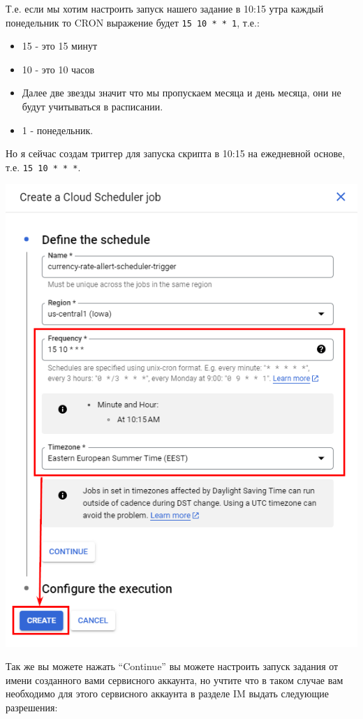 \documentclass[
]{book}
\providecommand{\tightlist}{%
  \setlength{\itemsep}{0pt}\setlength{\parskip}{0pt}}
\begin{document}
Т.е. если мы хотим настроить запуск нашего задание в 10:15 утра каждый понедельник то CRON выражение будет \texttt{15\ 10\ *\ *\ 1}, т.е.:

\begin{itemize}
\tightlist
\item
  15 - это 15 минут
\item
  10 - это 10 часов
\item
  Далее две звезды значит что мы пропускаем месяца и день месяца, они не будут учитываться в расписании.
\item
  1 - понедельник.
\end{itemize}

Но я сейчас создам триггер для запуска скрипта в 10:15 на ежедневной основе, т.е. \texttt{15\ 10\ *\ *\ *}.

\includegraphics{img/9-7.png}

Так же вы можете нажать ``Continue'' вы можете настроить запуск задания от имени созданного вами сервисного аккаунта, но учтите что в таком случае вам необходимо для этого сервисного аккаунта в разделе IM выдать следующие разрешения:
\end{document}
